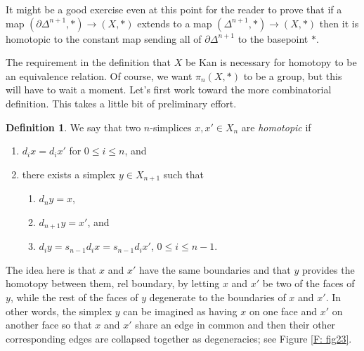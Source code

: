 \documentclass[12pt]{article}
\theoremstyle{plain}
\theoremstyle{definition}
\newtheorem{definition}[theorem]{Definition}
\newcommand{\bd}{\partial}
\begin{document}
It might be a good exercise even at this point for the reader to prove that if a map $(\bd \Delta^{n+1},*)\to (X,*)$ extends to a map $(\Delta^{n+1},*)\to (X,*)$ then it is homotopic to the constant map sending all of $\bd \Delta^{n+1}$ to the basepoint $*$.

The requirement in the definition that $X$ be Kan is necessary for homotopy to be an equivalence relation. Of course, we want $\pi_n(X,*)$ to be a group, but this will have to wait a moment. Let's first work toward the more combinatorial definition. This takes a little bit of preliminary effort. 

 
\begin{definition}\label{D: homotopy of simplices}
We say that two $n$-simplices $x,x'\in X_n$ are \emph{homotopic} if 
\begin{enumerate}
\item $d_ix=d_ix'$ for $0\leq i\leq n$, and 
\item there exists a simplex $y\in X_{n+1}$ such that 
\begin{enumerate}
\item $d_ny=x$, 
\item $d_{n+1}y=x'$, and
\item $d_iy=s_{n-1}d_ix=s_{n-1}d_ix'$, $0\leq i\leq n-1$. 
\end{enumerate}
\end{enumerate}
\end{definition}

The idea  here  is that $x$ and $x'$ have the same boundaries and that $y$ provides the homotopy between them, rel boundary, by letting $x$ and $x'$ be two of the faces of $y$, while the rest of the faces of $y$ degenerate to the boundaries of $x$ and $x'$.  In other words, the simplex $y$ can be imagined as having $x$ on one face and $x'$ on another face so that $x$ and $x'$ share an edge in common and then their other corresponding edges are collapsed together as degeneracies; see Figure \ref{F: fig23}.
\end{document}
